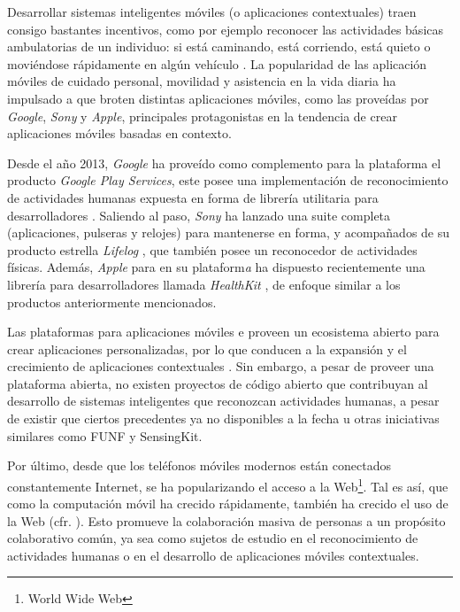 Desarrollar sistemas inteligentes móviles (o aplicaciones contextuales)
traen consigo bastantes incentivos, como por ejemplo reconocer las
actividades básicas ambulatorias de un individuo: si está caminando,
está corriendo, está quieto o moviéndose rápidamente en algún vehículo
\cite{CampuzanoLopez2015,Google2013l}. La popularidad de las aplicación
móviles de cuidado personal, movilidad y asistencia en la vida diaria
ha impulsado a que broten distintas aplicaciones móviles, como las
proveídas por \emph{Google}, \emph{Sony} y \emph{Apple}, principales
protagonistas en la tendencia de crear aplicaciones móviles basadas
en contexto.

Desde el año 2013, \emph{Google} ha proveído como complemento para
la plataforma \emph{ }\cite{Google2005a} el producto
\emph{Google Play Services}, este posee una implementación de reconocimiento
de actividades humanas expuesta en forma de librería utilitaria para
desarrolladores \cite{Google2013l}. Saliendo al paso, \emph{Sony}
ha lanzado una suite completa (aplicaciones, pulseras y relojes) para
mantenerse en forma, y acompañados de su producto estrella \emph{Lifelog}
\cite{Sony2016l}, que también posee un reconocedor de actividades
físicas. Además, \emph{Apple} para en su plataform\emph{a }
\cite{Apple2007i} ha dispuesto recientemente una librería para desarrolladores
llamada \emph{HealthKit} \cite{Apple2016h}, de enfoque similar a
los productos anteriormente mencionados. 

Las plataformas para aplicaciones móviles \emph{} e
\emph{} proveen un ecosistema abierto para crear aplicaciones
personalizadas, por lo que conducen a la expansión y el crecimiento
de aplicaciones contextuales \cite{Tanenbaum2010}. Sin embargo, a
pesar de proveer una plataforma abierta, no existen proyectos de código
abierto que contribuyan al desarrollo de sistemas inteligentes que
reconozcan actividades humanas, a pesar de existir que ciertos precedentes
ya no disponibles a la fecha \cite{Kwapisz2011,LaraLabrador2013}
u otras iniciativas similares como FUNF y SensingKit.

Por último, desde que los teléfonos móviles modernos están conectados
constantemente Internet, se ha popularizando el acceso a la Web\footnote{World Wide Web}.
Tal es así, que como la computación móvil ha crecido rápidamente,
también ha crecido el uso de la Web (cfr. \cite{NYTimes2008iph}).
Esto promueve la colaboración masiva de personas a un propósito colaborativo
común, ya sea como sujetos de estudio en el reconocimiento de actividades
humanas o en el desarrollo de aplicaciones móviles contextuales.

